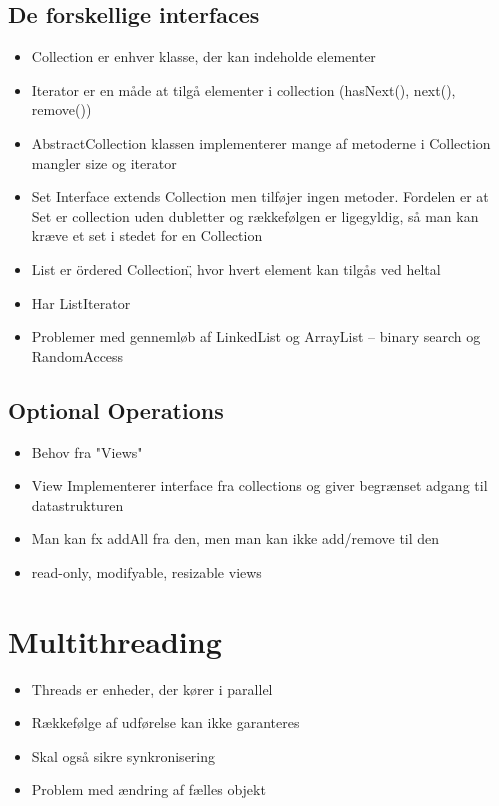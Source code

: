 \subsection{De forskellige interfaces} %
\label{sub:de_forskellige_interfaces}
\begin{itemize}
    \item Collection er enhver klasse, der kan indeholde elementer
    \item Iterator er en måde at tilgå elementer i collection (hasNext(), next(), remove())
    \item AbstractCollection klassen implementerer mange af metoderne i Collection mangler size og iterator
    \item Set Interface extends Collection men tilføjer ingen metoder. Fordelen er at Set er collection uden dubletter og rækkefølgen er ligegyldig, så man kan kræve et set i stedet for en Collection
    \item List er \"ordered Collection\", hvor hvert element kan tilgås ved heltal
    \item Har ListIterator
    \item Problemer med gennemløb af LinkedList og ArrayList -- binary search og RandomAccess
\end{itemize}
\subsection{Optional Operations} %
\label{sub:optional_operations}
\begin{itemize}
    \item Behov fra "Views"
    \item View Implementerer interface fra collections og giver begrænset adgang til datastrukturen
    \item Man kan fx addAll fra den, men man kan ikke add/remove til den
    \item read-only, modifyable, resizable views
\end{itemize}
\newpage
\section{Multithreading} %
\label{sec:multithreading}
\begin{itemize}
    \item Threads er enheder, der kører i parallel
    \item Rækkefølge af udførelse kan ikke garanteres
    \item Skal også sikre synkronisering
    \item Problem med ændring af fælles objekt
\end{itemize}

